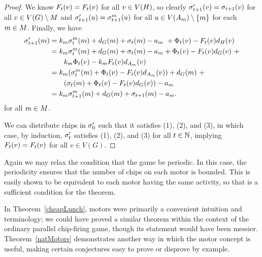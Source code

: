 \begin{proof}
We know $\firing[\s']{v}{t} = \firing{v}{t}$ for all $v \in \V[H]$, so clearly
$\chips[\s']{v}{t+1} = \chips{v}{t+1}$ for all $v \in \V[G] \setminus \mots$
and $\chips[\s']{u}{t+1} = \chips[\s^m]{u}{t+1}$ for all $u \in \V[A_m]
\setminus \{m\}$ for each $m \in \mots$. Finally, we have
\begin{align*}
  \chips[\s']{m}{t+1} &= k_m\chips[\s^m]{m}{t} + \deg[G]{m} + \chips{m}{t} -
  a_m\ + \receiving[\s']{v}{t} - \firing[\s']{v}{t}\deg[H]{v} \\
  &= k_m\chips[\s^m]{m}{t} + \deg[G]{m} + \chips{m}{t} - a_m + \receiving{v}{t}
  - \firing{v}{t}\deg[G]{v}\ + \\
  &\qquad k_m\receiving[\s^m]{v}{t} - k_m\firing[\s^m]{v}{t}\deg[{A_m}]{v} \\
  &= k_m(\chips[\s^m]{m}{t} + \receiving[\s^m]{v}{t} -
  \firing[\s']{v}{t}\deg[{A_m}]{v)} + \deg[G]{m}\ + \\
  &\qquad (\chips{m}{t} + \receiving[\s]{v}{t} - \firing[\s]{v}{t}\deg[G]{v)} -
  a_m \\
  &= k_m\chips[\s^m]{m}{t+1} + \deg[G]{m} + \chips{m}{t+1} - a_m.
\end{align*}
for all $m \in \mots$.

We can distribute chips in $\pos[\s']{0}$ such that it satisfies (1), (2), and
(3), in which case, by induction, $\pos[\s']{t}$ satisfies (1), (2), and (3)
for all $t \in \nats$, implying $\firing[\s']{v}{t} = \firing{v}{t}$ for all $v
\in V(G)$.
\end{proof}

Again we may relax the condition that the game be periodic. In this case, the
periodicity ensures that the number of chips on each motor is bounded. This is
easily shown to be equivalent to each motor having the same activity, so that
is a sufficient condition for the theorem.

In Theorem~\ref{cheapLunch}, motors were primarily a convenient intuition and
terminology; we could have proved a similar theorem within the context of the
ordinary parallel chip-firing game, though its statement would have been
messier. Theorem~\ref{natMotors} demonstrates another way in which the motor
concept is useful, making certain conjectures easy to prove or disprove by
example.

\hidegame
